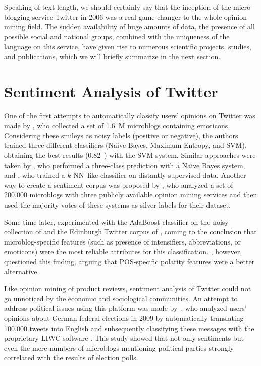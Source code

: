 
Speaking of text length, we should certainly say that the inception of
the micro-blogging service Twitter in 2006 was a real game changer to
the whole opinion mining field.  The sudden availability of huge
amounts of data, the presence of all possible social and national
groups, combined with the uniqueness of the language on this service,
have given rise to numerous scientific projects, studies, and
publications, which we will briefly summarize in the next section.

\section{Sentiment Analysis of Twitter}\label{snt:subsec:intro:saot}

One of the first attempts to automatically classify users' opinions on
Twitter was made by \citet{Go:09}, who collected a set of 1.6~M
microblogs containing emoticons.  Considering these smileys as noisy
labels (positive or negative), the authors trained three different
classifiers (Na\"{\i}ve Bayes, Maximum Entropy, and SVM), obtaining
the best results (0.82~\F{}) with the SVM system.  Similar approaches
were taken by \citet{Pak:10}, who performed a three-class prediction
with a Na\"{\i}ve Bayes system, and \citet{Davidov:10}, who trained a
$k$-NN--like classifier on distantly supervised data. Another way to
create a sentiment corpus was proposed by \citet{Barbosa:10}, who
analyzed a set of 200,000 microblogs with three publicly available
opinion mining services and then used the majority votes of these
systems as silver labels for their dataset.

Some time later, \citet{Kouloumpis:11} experimented with the AdaBoost
classifier on the noisy collection of \citet{Go:09} and the Edinburgh
Twitter corpus of \citet{Petrovic:10}, coming to the conclusion that
microblog-specific features (such as presence of intensifiers,
abbreviations, or emoticons) were the most reliable attributes for
this classification.  \citet{Agarwal:11}, however, questioned this
finding, arguing that POS-specific polarity features were a better
alternative.

Like opinion mining of product reviews, sentiment analysis of Twitter
could not go unnoticed by the economic and sociological communities.
An attempt to address political issues using this platform was made
by~\citet{Tumasjan:10}, who analyzed users' opinions about German
federal elections in 2009 by automatically translating 100,000 tweets
into English and subsequently classifying these messages with the
proprietary LIWC software \cite{Pannebaker:07}.  This study showed
that not only sentiments but even the mere numbers of microblogs
mentioning political parties strongly correlated with the results of
election polls.

